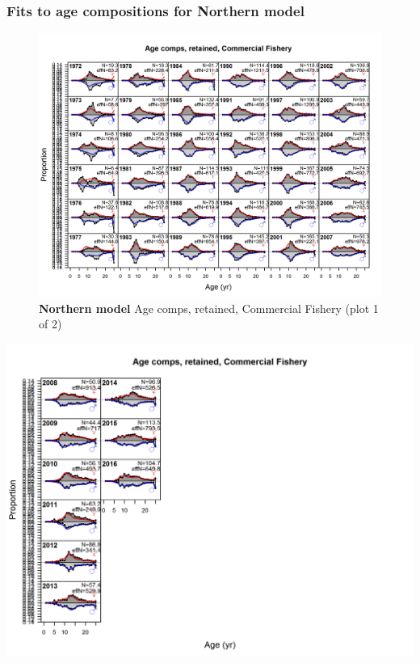\documentclass[12pt,]{article}
\begin{document}
\subsubsection{Fits to age compositions for Northern
model}\label{fits-to-age-compositions-for-northern-model}

\begin{figure}[htbp]
\centering
\includegraphics{./r4ss/plots_mod1/comp_agefit_flt1mkt2_page1.png}
\caption{\textbf{Northern model} Age comps, retained, Commercial Fishery
(plot 1 of 2) \label{fig:mod1_1_comp_agefit_flt1mkt2_page1}}
\end{figure}

\includegraphics{./r4ss/plots_mod1/comp_agefit_flt1mkt2_page2.png}
\end{document}
